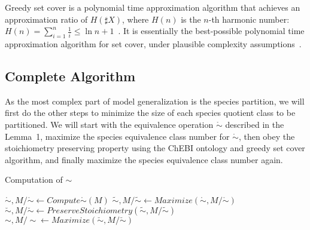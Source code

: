 \documentclass[10pt]{bmc_article}
\newenvironment{bmcformat}{\baselineskip20pt\sloppy\setboolean{publ}{false}}{\baselineskip20pt\sloppy}
\begin{document}
\begin{bmcformat}
Greedy set cover is a polynomial time approximation algorithm that achieves an approximation ratio of $H(\sharp X)$, where $H(n)$ is the $n$-th harmonic number: $H(n) = \sum^n_{i = 1}\frac{1}{i} \leq \ln{n} + 1$~\cite{Chvatal1979}. It is essentially the best-possible polynomial time approximation algorithm for set cover, under plausible complexity assumptions~\cite{Lund1994}. 

\subsection*{Complete Algorithm}
As the most complex part of model generalization is the species partition, we will first do the other steps to minimize the size of each species quotient class to be partitioned. We will start with the equivalence operation $\mathring{\sim}$ described in the Lemma~1, maximize the species equivalence class number for $\mathring{\sim}$, then obey the stoichiometry preserving property using the ChEBI ontology and greedy set cover algorithm, and finally maximize the species equivalence class number again.\\

\begin{algorithm}[H]
\SetAlgoVlined
{}
\caption{Computation of ${\sim}$}
\BlankLine
$\mathring{\sim}, M/\mathring{\sim} \leftarrow Compute\mathring{\sim}(M)$ \;
$\tilde{\sim}, M/\tilde{\sim} \leftarrow Maximize(\mathring{\sim}, M/{\mathring{\sim}})$ \;
$\breve{\sim}, M/\breve{\sim} \leftarrow PreserveStoichiometry(\tilde{\sim}, M/\tilde{\sim})$ \;
$\sim, M/\sim \leftarrow Maximize(\breve{\sim}, M/\breve{\sim})$ \;
\BlankLine
{}
\end{algorithm} 


\end{bmcformat}
\end{document}
